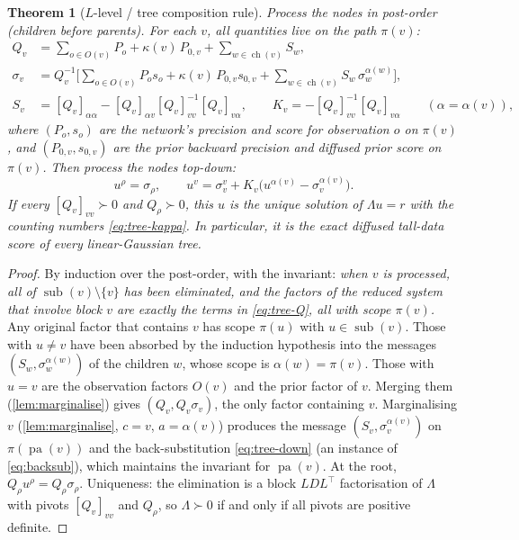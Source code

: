 \documentclass[11pt]{article}
\newtheorem{theorem}{Theorem}
\theoremstyle{definition}
\theoremstyle{remark}
\newcommand{\T}{\top}
\newcommand{\pa}{\operatorname{pa}}
\newcommand{\ch}{\operatorname{ch}}
\newcommand{\sub}{\operatorname{sub}}
\begin{document}
\begin{theorem}[$L$-level / tree composition rule]\label{thm:tree-rule}
Process the nodes in post-order (children before parents). For each $v$, all
quantities live on the path $\pi(v)$:
\begin{align}
Q_v&=\sum_{o\in O(v)}P_o+\kappa(v)\,P_{0,v}+\sum_{w\in\ch(v)}S_w,\label{eq:tree-Q}\\
\sigma_v&=Q_v^{-1}\Big[\sum_{o\in O(v)}P_os_o+\kappa(v)\,P_{0,v}s_{0,v}+\sum_{w\in\ch(v)}S_w\,\sigma_w^{\alpha(w)}\Big],\label{eq:tree-sigma}\\
S_v&=[Q_v]_{\alpha\alpha}-[Q_v]_{\alpha v}[Q_v]_{vv}^{-1}[Q_v]_{v\alpha},\qquad
K_v=-[Q_v]_{vv}^{-1}[Q_v]_{v\alpha}\qquad(\alpha=\alpha(v)),\label{eq:tree-S}
\end{align}
where $(P_o,s_o)$ are the network's precision and score for observation $o$ on
$\pi(v)$, and $(P_{0,v},s_{0,v})$ are the prior backward precision and diffused
prior score on $\pi(v)$. Then process the nodes top-down:
\begin{equation}\label{eq:tree-down}
u^\rho=\sigma_\rho,\qquad u^v=\sigma_v^v+K_v\big(u^{\alpha(v)}-\sigma_v^{\alpha(v)}\big).
\end{equation}
If every $[Q_v]_{vv}\succ0$ and $Q_\rho\succ0$, this $u$ is the unique solution of
$\Lambda u=r$ with the counting numbers \eqref{eq:tree-kappa}. In particular, it
is the exact diffused tall-data score of every linear-Gaussian tree.
\end{theorem}
\begin{proof}
By induction over the post-order, with the invariant: \emph{when $v$ is
processed, all of $\sub(v)\setminus\{v\}$ has been eliminated, and the factors of
the reduced system that involve block $v$ are exactly the terms in
\eqref{eq:tree-Q}, all with scope $\pi(v)$.} Any original factor that contains
$v$ has scope $\pi(u)$ with $u\in\sub(v)$. Those with $u\neq v$ have been
absorbed by the induction hypothesis into the messages $(S_w,\sigma_w^{\alpha(w)})$
of the children $w$, whose scope is $\alpha(w)=\pi(v)$. Those with $u=v$ are the
observation factors $O(v)$ and the prior factor of $v$. Merging them
(\cref{lem:marginalise}) gives $(Q_v,Q_v\sigma_v)$, the only factor containing
$v$. Marginalising $v$ (\cref{lem:marginalise}, $c=v$, $a=\alpha(v)$) produces the
message $(S_v,\sigma_v^{\alpha(v)})$ on $\pi(\pa(v))$ and the back-substitution
\eqref{eq:tree-down} (an instance of \eqref{eq:backsub}), which maintains the invariant for $\pa(v)$. At the root,
$Q_\rho u^\rho=Q_\rho\sigma_\rho$. Uniqueness: the elimination is a block
$LDL^\T$ factorisation of $\Lambda$ with pivots $[Q_v]_{vv}$ and $Q_\rho$, so
$\Lambda\succ0$ if and only if all pivots are positive definite.
\end{proof}
\end{document}
